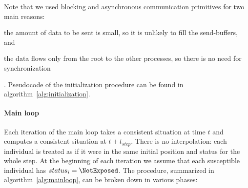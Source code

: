 Note that we used blocking and asynchronous communication primitives for two main reasons:
\begin{enumerate*}[label=(\roman*)]
    \item the amount of data to be sent is small, so it is unlikely to fill the send-buffers, and
    \item the data flows only from the root to the other processes, so there is no need for synchronization
\end{enumerate*}.
Pseudocode of the initialization procedure can be found in algorithm~\ref{alg:initialization}.

\paragraph{Main loop}
Each iteration of the main loop takes a consistent situation at time $t$ and computes a consistent situation at $t + t_{step}$. There is no interpolation: each individual is treated as if it were in the same initial position and status for the whole step. At the beginning of each iteration we assume that each susceptible individual has $status_i = \NotExposed$.
The procedure, summarized in algorithm~\ref{alg:mainloop}, can be broken down in various phases:
